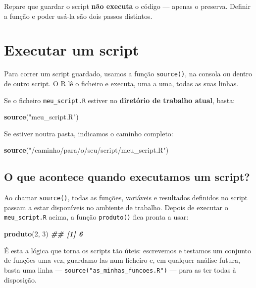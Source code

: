 \documentclass[
  portuguese,
  11pt,
  openany]{book}
\newenvironment{Shaded}{\begin{snugshade}}{\end{snugshade}}
\newcommand{\DecValTok}[1]{\textcolor[rgb]{0.00,0.00,0.81}{#1}}
\newcommand{\DocumentationTok}[1]{\textcolor[rgb]{0.56,0.35,0.01}{\textbf{\textit{#1}}}}
\newcommand{\FunctionTok}[1]{\textcolor[rgb]{0.13,0.29,0.53}{\textbf{#1}}}
\newcommand{\NormalTok}[1]{#1}
\newcommand{\StringTok}[1]{\textcolor[rgb]{0.31,0.60,0.02}{#1}}
\begin{document}
Repare que guardar o script \textbf{não executa} o código --- apenas o preserva. Definir a
função e poder usá-la são dois passos distintos.

\section{Executar um script}\label{executar-um-script}

Para correr um script guardado, usamos a função \texttt{source()}, na consola ou dentro de
outro script. O R lê o ficheiro e executa, uma a uma, todas as suas linhas.

Se o ficheiro \texttt{meu\_script.R} estiver no \textbf{diretório de trabalho atual}, basta:

\begin{Shaded}
\begin{Highlighting}[]
\FunctionTok{source}\NormalTok{(}\StringTok{"meu\_script.R"}\NormalTok{)}
\end{Highlighting}
\end{Shaded}

Se estiver noutra pasta, indicamos o caminho completo:

\begin{Shaded}
\begin{Highlighting}[]
\FunctionTok{source}\NormalTok{(}\StringTok{"/caminho/para/o/seu/script/meu\_script.R"}\NormalTok{)}
\end{Highlighting}
\end{Shaded}

\subsection{O que acontece quando executamos um script?}\label{o-que-acontece-quando-executamos-um-script}

Ao chamar \texttt{source()}, todas as funções, variáveis e resultados definidos no script
passam a estar disponíveis no ambiente de trabalho. Depois de executar o
\texttt{meu\_script.R} acima, a função \texttt{produto()} fica pronta a usar:

\begin{Shaded}
\begin{Highlighting}[]
\FunctionTok{produto}\NormalTok{(}\DecValTok{2}\NormalTok{, }\DecValTok{3}\NormalTok{)}
\DocumentationTok{\#\# [1] 6}
\end{Highlighting}
\end{Shaded}

É esta a lógica que torna os scripts tão úteis: escrevemos e testamos um conjunto de
funções uma vez, guardamo-las num ficheiro e, em qualquer análise futura, basta uma
linha --- \texttt{source("as\_minhas\_funcoes.R")} --- para as ter todas à disposição.
\end{document}
